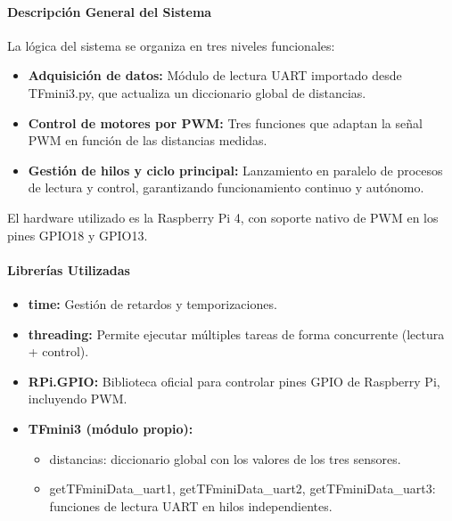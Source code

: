 \documentclass[12pt,a4paper]{article}
\begin{document}
\paragraph{Descripción General del Sistema}
La lógica del sistema se organiza en tres niveles funcionales:
\begin{itemize}
\item \textbf{Adquisición de datos:} Módulo de lectura UART importado desde TFmini3.py, que actualiza un diccionario global de distancias.
\item \textbf{Control de motores por PWM:} Tres funciones que adaptan la señal PWM en función de las distancias medidas.
\item \textbf{Gestión de hilos y ciclo principal:} Lanzamiento en paralelo de procesos de lectura y control, garantizando funcionamiento continuo y autónomo.
\end{itemize}
El hardware utilizado es la Raspberry Pi 4, con soporte nativo de PWM en los pines GPIO18 y GPIO13.

\paragraph{Librerías Utilizadas}
\begin{itemize}
\item \textbf{time:} Gestión de retardos y temporizaciones.
\item \textbf{threading:} Permite ejecutar múltiples tareas de forma concurrente (lectura + control).
\item \textbf{RPi.GPIO:} Biblioteca oficial para controlar pines GPIO de Raspberry Pi, incluyendo PWM.
\item \textbf{TFmini3 (módulo propio):}
\begin{itemize}
\item distancias: diccionario global con los valores de los tres sensores.
\item getTFminiData\_uart1, getTFminiData\_uart2, getTFminiData\_uart3: funciones de lectura UART en hilos independientes.
\end{itemize}
\end{itemize}
\end{document}
